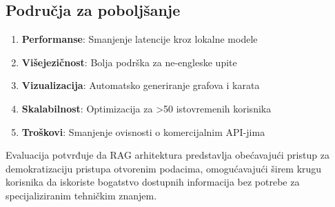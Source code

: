 \subsection{Područja za poboljšanje}

\begin{enumerate}
    \item \textbf{Performanse}: Smanjenje latencije kroz lokalne modele
    \item \textbf{Višejezičnost}: Bolja podrška za ne-engleske upite
    \item \textbf{Vizualizacija}: Automatsko generiranje grafova i karata
    \item \textbf{Skalabilnost}: Optimizacija za >50 istovremenih korisnika
    \item \textbf{Troškovi}: Smanjenje ovisnosti o komercijalnim API-jima
\end{enumerate}

Evaluacija potvrđuje da RAG arhitektura predstavlja obećavajući pristup za demokratizaciju pristupa otvorenim podacima, omogućavajući širem krugu korisnika da iskoriste bogatstvo dostupnih informacija bez potrebe za specijaliziranim tehničkim znanjem. 